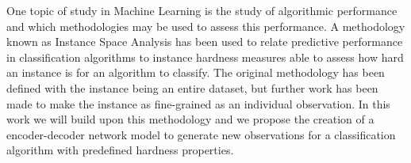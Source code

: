 One topic of study in Machine Learning is the study of algorithmic performance and which methodologies may be used to assess this performance. A methodology known as Instance Space Analysis has been used to relate predictive performance in classification algorithms to instance hardness measures able to assess how hard an instance is for an algorithm to classify. The original methodology has been defined with the instance being an entire dataset, but further work has been made to make the instance as fine-grained as an individual observation. In this work we will build upon this methodology and we propose the creation of a encoder-decoder network model to generate new observations for a classification algorithm with predefined hardness properties.

